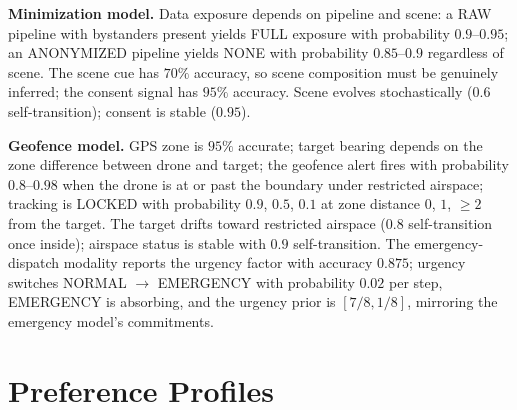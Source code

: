 \documentclass[10pt,twocolumn]{article}
\begin{document}
\textbf{Minimization model.} Data exposure depends on pipeline and scene: a RAW pipeline with bystanders present yields FULL exposure with probability $0.9$--$0.95$; an ANONYMIZED pipeline yields NONE with probability $0.85$--$0.9$ regardless of scene. The scene cue has $70\%$ accuracy, so scene composition must be genuinely inferred; the consent signal has $95\%$ accuracy. Scene evolves stochastically ($0.6$ self-transition); consent is stable ($0.95$).

\textbf{Geofence model.} GPS zone is $95\%$ accurate; target bearing depends on the zone difference between drone and target; the geofence alert fires with probability $0.8$--$0.98$ when the drone is at or past the boundary under restricted airspace; tracking is LOCKED with probability $0.9$, $0.5$, $0.1$ at zone distance $0$, $1$, $\geq 2$ from the target. The target drifts toward restricted airspace ($0.8$ self-transition once inside); airspace status is stable with $0.9$ self-transition. The emergency-dispatch modality reports the urgency factor with accuracy $0.875$; urgency switches NORMAL $\to$ EMERGENCY with probability $0.02$ per step, EMERGENCY is absorbing, and the urgency prior is $[7/8, 1/8]$, mirroring the emergency model's commitments.

\begin{table}[H]
\centering
\scriptsize
{}
\caption{Inference and planning hyperparameters, shared across experiments unless noted in the main text.}
\label{tab:app-hyper}
\end{table}

\section{Preference Profiles}
\label{app:profiles}
\end{document}
